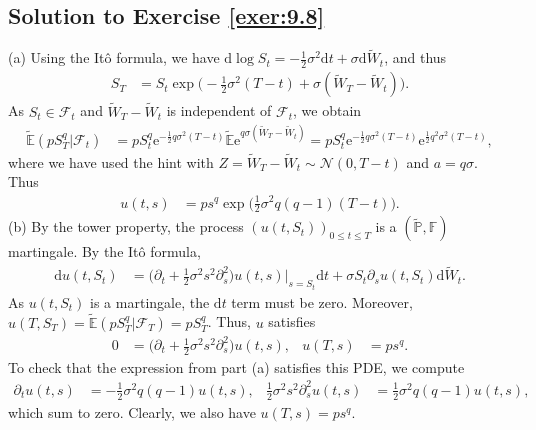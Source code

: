 \documentclass[12pt]{book}
\numberwithin{equation}{chapter}
\theoremstyle{plain}
\numberwithin{theorem}{section}
\theoremstyle{definition}
\numberwithin{exercise}{chapter}
\newcommand{\<}{\langle}
\renewcommand{\>}{\rangle}
\renewcommand{\(}{\left(}
\renewcommand{\)}{\right)}
\renewcommand{\[}{\left[}
\renewcommand{\]}{\right]}
\newcommand\Eb{\mathds{E}}
\newcommand\Fb{\mathds{F}}
\newcommand\Pb{\mathds{P}}
\newcommand\Fc{\mathscr{F}}
\newcommand\Nc{\mathscr{N}}
\newcommand\sig{\sigma}
\newcommand\Ebt{\widetilde{\Eb}}
\newcommand\Pbt{\widetilde{\Pb}}
\newcommand\Wt{\widetilde{W}}
\renewcommand\d{\partial}
\newcommand\dd{\mathrm{d}}
\newcommand\ee{\mathrm{e}}
\begin{document}
\subsection*{Solution to Exercise \ref{exer:9.8}}
(a) Using the It\^o formula, we have $\dd \log S_t = - \tfrac{1}{2} \sig^2 \dd t + \sig \dd \Wt_t$, and thus
\begin{align}
S_T
	&=	S_t \exp \Big( - \tfrac{1}{2} \sig^2 (T-t) + \sig ( \Wt_T - \Wt_t ) \Big) .
\end{align}
As $S_t \in \Fc_t$ and $\Wt_T - \Wt_t$ is independent of $\Fc_t$, we obtain
\begin{align}
\Ebt( p S_T^q | \Fc_t )
	&=	p S_t^q \ee^{ - \tfrac{1}{2} q \sig^2 (T-t)} \Ebt \ee^{ q \sig ( \Wt_T - \Wt_t ) }
	=		p S_t^q \ee^{ - \tfrac{1}{2} q \sig^2 (T-t)} \ee^{ \tfrac{1}{2} q^2 \sig^2 (T-t)} ,
\end{align}
where we have used the hint with $Z = \Wt_T - \Wt_t \sim \Nc(0,T-t)$ and $a = q \sig$.  Thus
\begin{align}
u(t,s)
	&=	p s^q \exp \Big( \tfrac{1}{2} \sig^2 q (q-1) (T-t) \Big) .
\end{align}
(b) By the tower property, the process $(u(t,S_t))_{0 \leq t \leq T}$ is a $(\Pbt,\Fb)$ martingale.  By the It\^o formula,
\begin{align}
\dd u(t,S_t)
	&=	\Big( \d_t + \tfrac{1}{2} \sig^2 s^2 \d_s^2 \Big) u(t,s) \Big|_{s = S_t} \dd t + \sig S_t \d_s u(t,S_t) \dd \Wt_t .
\end{align}
As $u(t,S_t)$ is a martingale, the $\dd t$ term must be zero.  Moreover, $u(T,S_T) = \Ebt( p S_T^q | \Fc_T ) = p S_T^q$.  Thus, $u$ satisfies
\begin{align}
0
	&=	\Big( \d_t + \tfrac{1}{2} \sig^2 s^2 \d_s^2 \Big) u(t,s) , &
u(T,s)
	&=	p s^q .
\end{align}
To check that the expression from part (a) satisfies this PDE, we compute
\begin{align}
\d_t u(t,s)
	&=	- \tfrac{1}{2} \sig^2 q (q-1) u(t,s) , &
\tfrac{1}{2} \sig^2 s^2 \d_s^2 u(t,s)
	&=	\tfrac{1}{2} \sig^2 q (q-1) u(t,s) ,
\end{align}
which sum to zero.  Clearly, we also have $u(T,s) = p s^q$.
\end{document}
